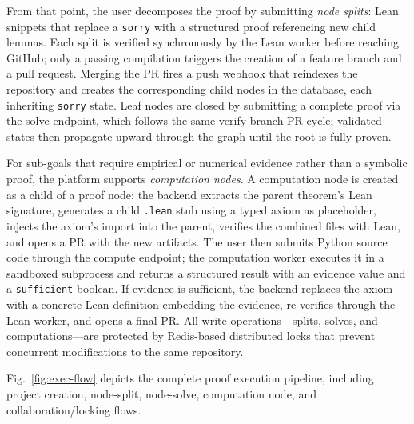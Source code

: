 \documentclass[conference]{IEEEtran}
\begin{document}
From that point, the user decomposes the proof by submitting \emph{node
splits}: Lean snippets that replace a \texttt{sorry} with a structured
proof referencing new child lemmas. Each split is verified synchronously
by the Lean worker before reaching GitHub; only a passing compilation
triggers the creation of a feature branch and a pull request. Merging
the PR fires a push webhook that reindexes the repository and creates
the corresponding child nodes in the database, each inheriting
\texttt{sorry} state. Leaf nodes are closed by submitting a complete
proof via the solve endpoint, which follows the same verify-branch-PR
cycle; validated states then propagate upward through the graph until
the root is fully proven.

For sub-goals that require empirical or numerical evidence rather than a
symbolic proof, the platform supports \emph{computation nodes}. A
computation node is created as a child of a proof node: the backend
extracts the parent theorem's Lean signature, generates a child
\texttt{.lean} stub using a typed axiom as placeholder, injects the
axiom's import into the parent, verifies the combined files with Lean,
and opens a PR with the new artifacts. The user then submits Python
source code through the compute endpoint; the computation worker
executes it in a sandboxed subprocess and returns a structured result
with an evidence value and a \texttt{sufficient} boolean. If evidence
is sufficient, the backend replaces the axiom with a concrete Lean
definition embedding the evidence, re-verifies through the Lean worker,
and opens a final PR. All write operations---splits, solves, and
computations---are protected by Redis-based distributed locks that
prevent concurrent modifications to the same repository.

Fig.~\ref{fig:exec-flow} depicts the complete proof execution pipeline,
including project creation, node-split, node-solve, computation node,
and collaboration/locking flows.
\end{document}
